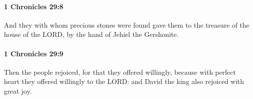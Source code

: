 		\paragraph{1 Chronicles 29:8} %
			\label{1CHRONICLES-29-8}

			And they with whom precious stones were found gave them to the treasure of the house of the LORD, by the hand of Jehiel the Gershonite.


		\paragraph{1 Chronicles 29:9} %
			\label{1CHRONICLES-29-9}

			Then the people rejoiced, for that they offered willingly, because with perfect heart they offered willingly to the LORD: and David the king also rejoiced with great joy.


